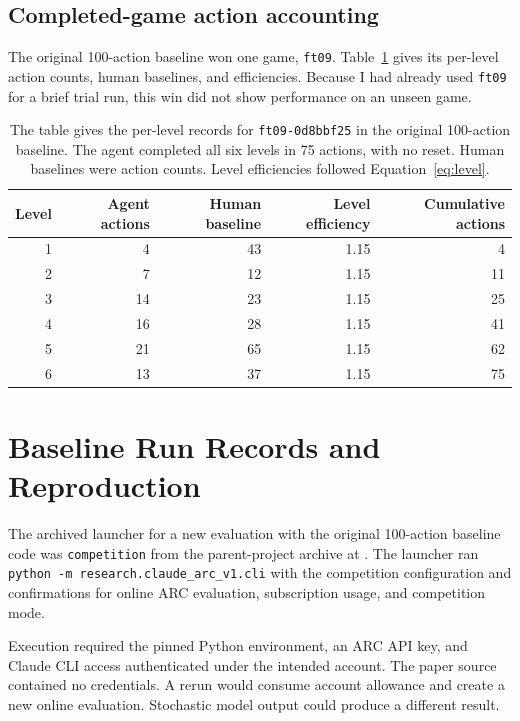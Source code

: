 \subsection{Completed-game action accounting}
The original 100-action baseline won one game, \texttt{ft09}. Table~\ref{tab:ft09} gives its per-level action counts, human baselines, and efficiencies. Because I had already used \texttt{ft09} for a brief trial run, this win did not show performance on an unseen game.
\begin{table}[H]
\centering\small
\begin{tabular}{@{}rrrrr@{}}\toprule
Level & Agent actions & Human baseline & Level efficiency & Cumulative actions\\\midrule
1 & 4 & 43 & 1.15 & 4\\
2 & 7 & 12 & 1.15 & 11\\
3 & 14 & 23 & 1.15 & 25\\
4 & 16 & 28 & 1.15 & 41\\
5 & 21 & 65 & 1.15 & 62\\
6 & 13 & 37 & 1.15 & 75\\\bottomrule
\end{tabular}
\caption{The table gives the per-level records for \texttt{ft09-0d8bbf25} in the original 100-action baseline. The agent completed all six levels in 75 actions, with no reset. Human baselines were action counts. Level efficiencies followed Equation~\eqref{eq:level}.}\label{tab:ft09}
\end{table}

\section{Baseline Run Records and Reproduction}\label{app:records}
The archived launcher for a new evaluation with the original 100-action baseline code was  \texttt{competition} from the parent-project archive at . The launcher ran \texttt{python -m research.claude\_arc\_v1.cli} with the competition configuration and confirmations for online ARC evaluation, subscription usage, and competition mode.

Execution required the pinned Python environment, an ARC API key, and Claude CLI access authenticated under the intended account. The paper source contained no credentials. A rerun would consume account allowance and create a new online evaluation. Stochastic model output could produce a different result.

